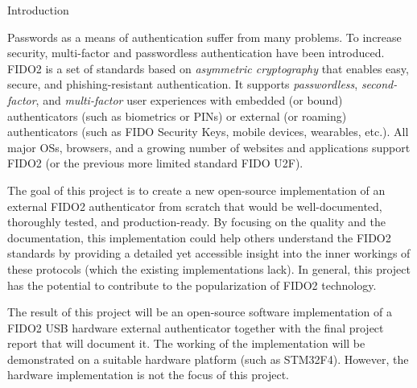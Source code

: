 \chap[intro] Introduction

Passwords as a means of authentication suffer from many problems. To increase security, multi-factor and passwordless authentication have been introduced. {\sbf FIDO2} is a set of standards based on {\em asymmetric cryptography} that enables easy, secure, and phishing-resistant authentication. It supports {\em passwordless}, {\em second-factor}, and {\em multi-factor} user experiences with embedded (or bound) authenticators (such as biometrics or PINs) or external (or roaming) authenticators (such as FIDO Security Keys, mobile devices, wearables, etc.). All major OSs, browsers, and a growing number of websites and applications support FIDO2 (or the previous more limited standard FIDO U2F).

The goal of this project is to create a new open-source implementation of an external FIDO2 authenticator from scratch that would be well-documented, thoroughly tested, and production-ready. By focusing on the quality and the documentation, this implementation could help others understand the FIDO2 standards by providing a detailed yet accessible insight into the inner workings of these protocols (which the existing implementations lack). In general, this project has the potential to contribute to the popularization of FIDO2 technology.

The result of this project will be an open-source software implementation of a FIDO2 USB hardware external authenticator together with the final project report that will document it. The working of the implementation will be demonstrated on a suitable hardware platform (such as STM32F4). However, the hardware implementation is not the focus of this project.
